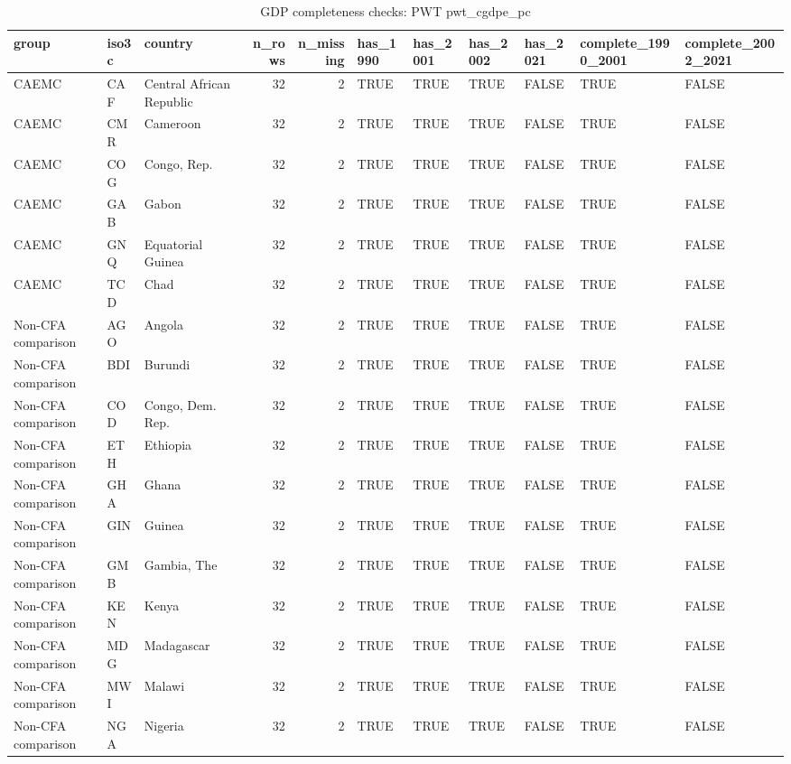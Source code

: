 \begin{table}

\caption{GDP completeness checks: PWT pwt_cgdpe_pc}
\centering
\begin{tabular}[t]{lllrrllllll}
\toprule
group & iso3c & country & n\_rows & n\_missing & has\_1990 & has\_2001 & has\_2002 & has\_2021 & complete\_1990\_2001 & complete\_2002\_2021\\
\midrule
CAEMC & CAF & Central African Republic & 32 & 2 & TRUE & TRUE & TRUE & FALSE & TRUE & FALSE\\
CAEMC & CMR & Cameroon & 32 & 2 & TRUE & TRUE & TRUE & FALSE & TRUE & FALSE\\
CAEMC & COG & Congo, Rep. & 32 & 2 & TRUE & TRUE & TRUE & FALSE & TRUE & FALSE\\
CAEMC & GAB & Gabon & 32 & 2 & TRUE & TRUE & TRUE & FALSE & TRUE & FALSE\\
CAEMC & GNQ & Equatorial Guinea & 32 & 2 & TRUE & TRUE & TRUE & FALSE & TRUE & FALSE\\
\addlinespace
CAEMC & TCD & Chad & 32 & 2 & TRUE & TRUE & TRUE & FALSE & TRUE & FALSE\\
Non-CFA comparison & AGO & Angola & 32 & 2 & TRUE & TRUE & TRUE & FALSE & TRUE & FALSE\\
Non-CFA comparison & BDI & Burundi & 32 & 2 & TRUE & TRUE & TRUE & FALSE & TRUE & FALSE\\
Non-CFA comparison & COD & Congo, Dem. Rep. & 32 & 2 & TRUE & TRUE & TRUE & FALSE & TRUE & FALSE\\
Non-CFA comparison & ETH & Ethiopia & 32 & 2 & TRUE & TRUE & TRUE & FALSE & TRUE & FALSE\\
\addlinespace
Non-CFA comparison & GHA & Ghana & 32 & 2 & TRUE & TRUE & TRUE & FALSE & TRUE & FALSE\\
Non-CFA comparison & GIN & Guinea & 32 & 2 & TRUE & TRUE & TRUE & FALSE & TRUE & FALSE\\
Non-CFA comparison & GMB & Gambia, The & 32 & 2 & TRUE & TRUE & TRUE & FALSE & TRUE & FALSE\\
Non-CFA comparison & KEN & Kenya & 32 & 2 & TRUE & TRUE & TRUE & FALSE & TRUE & FALSE\\
Non-CFA comparison & MDG & Madagascar & 32 & 2 & TRUE & TRUE & TRUE & FALSE & TRUE & FALSE\\
\addlinespace
Non-CFA comparison & MWI & Malawi & 32 & 2 & TRUE & TRUE & TRUE & FALSE & TRUE & FALSE\\
Non-CFA comparison & NGA & Nigeria & 32 & 2 & TRUE & TRUE & TRUE & FALSE & TRUE & FALSE\\

\end{tabular}
\end{table}
